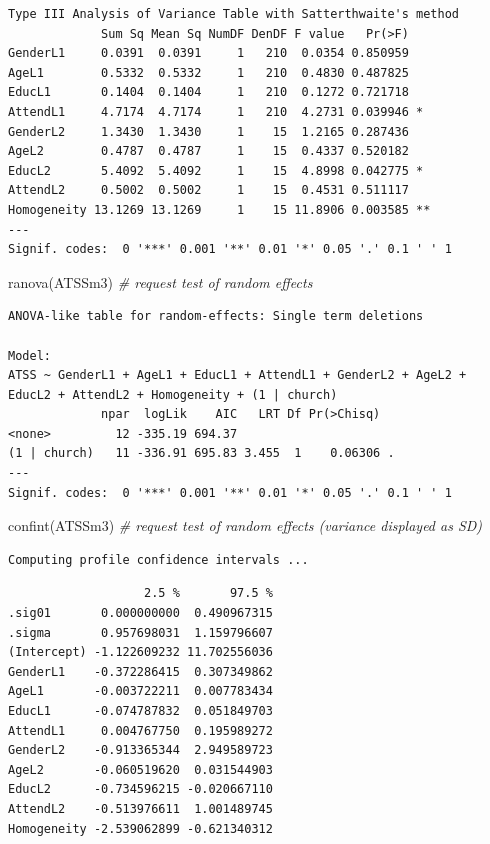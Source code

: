 \documentclass[
  english,
]{book}
\newenvironment{Shaded}{\begin{snugshade}}{\end{snugshade}}
\newcommand{\CommentTok}[1]{\textcolor[rgb]{0.56,0.35,0.01}{\textit{#1}}}
\newcommand{\FunctionTok}[1]{\textcolor[rgb]{0.00,0.00,0.00}{#1}}
\newcommand{\NormalTok}[1]{#1}
\begin{document}
\begin{verbatim}
Type III Analysis of Variance Table with Satterthwaite's method
             Sum Sq Mean Sq NumDF DenDF F value   Pr(>F)   
GenderL1     0.0391  0.0391     1   210  0.0354 0.850959   
AgeL1        0.5332  0.5332     1   210  0.4830 0.487825   
EducL1       0.1404  0.1404     1   210  0.1272 0.721718   
AttendL1     4.7174  4.7174     1   210  4.2731 0.039946 * 
GenderL2     1.3430  1.3430     1    15  1.2165 0.287436   
AgeL2        0.4787  0.4787     1    15  0.4337 0.520182   
EducL2       5.4092  5.4092     1    15  4.8998 0.042775 * 
AttendL2     0.5002  0.5002     1    15  0.4531 0.511117   
Homogeneity 13.1269 13.1269     1    15 11.8906 0.003585 **
---
Signif. codes:  0 '***' 0.001 '**' 0.01 '*' 0.05 '.' 0.1 ' ' 1
\end{verbatim}

\begin{Shaded}
\begin{Highlighting}[]
\FunctionTok{ranova}\NormalTok{(ATSSm3) }\CommentTok{\# request test of random effects}
\end{Highlighting}
\end{Shaded}

\begin{verbatim}
ANOVA-like table for random-effects: Single term deletions

Model:
ATSS ~ GenderL1 + AgeL1 + EducL1 + AttendL1 + GenderL2 + AgeL2 + EducL2 + AttendL2 + Homogeneity + (1 | church)
             npar  logLik    AIC   LRT Df Pr(>Chisq)  
<none>         12 -335.19 694.37                      
(1 | church)   11 -336.91 695.83 3.455  1    0.06306 .
---
Signif. codes:  0 '***' 0.001 '**' 0.01 '*' 0.05 '.' 0.1 ' ' 1
\end{verbatim}

\begin{Shaded}
\begin{Highlighting}[]
\FunctionTok{confint}\NormalTok{(ATSSm3) }\CommentTok{\# request test of random effects (variance displayed as SD)}
\end{Highlighting}
\end{Shaded}

\begin{verbatim}
Computing profile confidence intervals ...
\end{verbatim}

\begin{verbatim}
                   2.5 %       97.5 %
.sig01       0.000000000  0.490967315
.sigma       0.957698031  1.159796607
(Intercept) -1.122609232 11.702556036
GenderL1    -0.372286415  0.307349862
AgeL1       -0.003722211  0.007783434
EducL1      -0.074787832  0.051849703
AttendL1     0.004767750  0.195989272
GenderL2    -0.913365344  2.949589723
AgeL2       -0.060519620  0.031544903
EducL2      -0.734596215 -0.020667110
AttendL2    -0.513976611  1.001489745
Homogeneity -2.539062899 -0.621340312
\end{verbatim}
\end{document}
